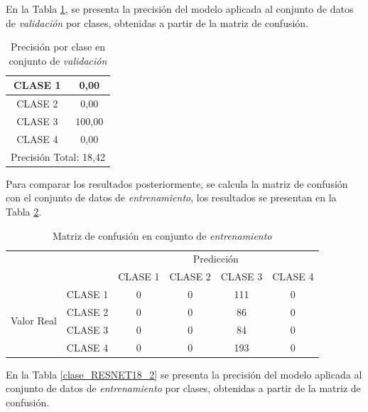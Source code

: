 En la Tabla \ref*{clase_RESNET18}, se presenta la precisión del modelo aplicada al conjunto de datos de \textit{validación} por clases, obtenidas a partir de la matriz de confusión.

\newpage
\begin{table}[htbp]
	\centering
	\begin{tabular}{|c|c|}
		\hline
		CLASE 1 & 0,00 \bigstrut\\
		\hline
		CLASE 2 & 0,00 \bigstrut\\
		\hline
		CLASE 3 & 100,00 \bigstrut\\
		\hline
		CLASE 4 & 0,00 \bigstrut\\
		\hline
		\multicolumn{2}{|c|}{Precisión Total: 18,42} \bigstrut\\
		\hline
	\end{tabular}	
	\caption{Precisión por clase en conjunto de \textit{validación}}
	\label{clase_RESNET18}
\end{table}%


Para comparar los resultados posteriormente, se calcula la matriz de confusión con el conjunto de datos de \textit{entrenamiento}, los resultados se presentan en la Tabla \ref{MC_RESNET18_2}.

\begin{table}[htbp]
	\centering
	\resizebox{10cm}{!} {
		\begin{tabular}{|c|l|c|c|c|c|}
			\hline
			\multicolumn{2}{|c|}{\multirow{2}[4]{*}{}} & \multicolumn{4}{c|}{Predicción} \bigstrut\\
			\cline{3-6}    \multicolumn{2}{|c|}{} & CLASE 1 & CLASE 2 & CLASE 3 & CLASE 4 \bigstrut\\
			\hline
			\multirow{4}[8]{*}{\begin{sideways}Valor Real\end{sideways}} & CLASE 1 & 0     & 0     & 111    & 0 \bigstrut\\
			\cline{2-6}          & CLASE 2 & 0     & 0     & 86    & 0 \bigstrut\\
			\cline{2-6}          & CLASE 3 & 0     & 0     & 84    & 0 \bigstrut\\
			\cline{2-6}          & CLASE 4 & 0     & 0     & 193    & 0 \bigstrut\\
			\hline
		\end{tabular}%
	}
	\caption{Matriz de confusión en conjunto de \textit{entrenamiento}}
	\label{MC_RESNET18_2}
\end{table}%

En la Tabla \ref*{clase_RESNET18_2} se presenta la precisión del modelo aplicada al conjunto de datos de \textit{entrenamiento} por clases, obtenidas a partir de la matriz de confusión.

